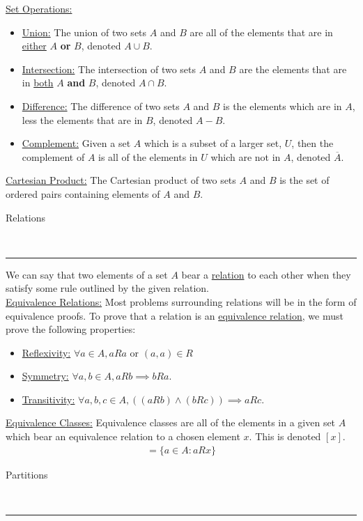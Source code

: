 \documentclass{article}
\newcommand{\header}[1]{\begin{large}\noindent #1\end{large}\\\rule{\textwidth}{0.5pt}}
\newcommand{\gap}{\medskip\\}
\newcommand{\sheader}[1]{\underline{#1:}}
\begin{document}
\sheader{Set Operations}
\begin{itemize}
    \item \sheader{Union} The union of two sets $A$ and $B$ are all of the 
    elements that are in \underline{either} $A$ \textbf{or} $B$, denoted $A \cup B$.
    \item \sheader{Intersection} The intersection of two sets $A$ and $B$ are 
    the elements that are in \underline{both} $A$ \textbf{and} $B$, denoted $A \cap B$.
    \item \sheader{Difference} The difference of two sets $A$ and $B$ is the elements
    which are in $A$, less the elements that are in $B$, denoted $A - B$.
    \item \sheader{Complement} Given a set $A$ which is a subset of a larger set,
    $U$, then the complement of $A$ is all of the elements in $U$ which are not in 
    $A$, denoted $\overline{A}$.
\end{itemize}
\sheader{Cartesian Product} The Cartesian product of two sets $A$ and $B$ is the 
set of ordered pairs containing elements of $A$ and $B$.
\gap
\header{Relations}
We can say that two elements of a set $A$ bear a \underline{relation} to each other 
when they satisfy some rule outlined by the given relation.
\gap
\sheader{Equivalence Relations} Most problems surrounding relations will be in 
the form of equivalence proofs. To prove that a relation is an \underline{equivalence relation},
we must prove the following properties:
\begin{itemize}
    \item \sheader{Reflexivity} $\forall a \in A, aRa$ or $(a, a) \in R$
    \item \sheader{Symmetry} $\forall a, b \in A, aRb \implies bRa$.
    \item \sheader{Transitivity} $\forall a, b, c \in A, ((aRb) \wedge (bRc))\implies aRc$.
\end{itemize}
\sheader{Equivalence Classes} Equivalence classes are all of the elements in a given 
set $A$ which bear an equivalence relation to a chosen element $x$. This is denoted $[x]$.
\begin{align*}
    [x] = \{ a \in A : aRx \}
\end{align*}

\header{Partitions}
\end{document}
